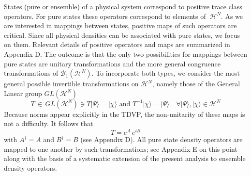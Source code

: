 \documentclass[aps,preprint]{revtex4}%
\begin{document}
States (pure or ensemble) of a physical system correspond to positive trace
class operators. For pure states these operators correspond to elements of
$\ \mathcal{H}^{N}$. As we are interested in mappings between states, positive
maps of such operators are critical. Since all physical densities can be
associated with pure states, we focus on them. Relevant details of positive
operators and maps are summarized in Appendix D. The outcome is that the only
two possibilities for mappings between pure states are unitary transformations
and the more general congruence transformations\cite{congruence} of
$\mathcal{B}_{1}\left(  \mathcal{H}^{N}\right)  $. To incorporate both types,
we consider the most general possible invertible transformations on
$\mathcal{H}^{N}$, namely those of the General Linear group $GL(\mathcal{H}%
^{N})$
\begin{equation}
T\,\in\,GL(\mathcal{H}^{N})\ni T|\Psi\rangle=|\chi\rangle\text{ and }%
T^{-1}|\chi\rangle=|\Psi\rangle\quad\forall|\Psi\rangle,|\chi\rangle
\in\mathcal{H}^{N}%
\end{equation}
Because norms appear explicitly in the TDVP, the non-unitarity of these maps
is not a difficulty. It follows that
\begin{equation}
T=e^{A}\,e^{iB} \label{eAeiB}%
\end{equation}
with $A^{\dagger}=A$ and $B^{\dagger}=B$ (see Appendix D). All pure state
density operators are mapped to one another by such transformations; see
Appendix E on this point along with the basis of a systematic extension of the
present analysis to ensemble density operators.
\end{document}
